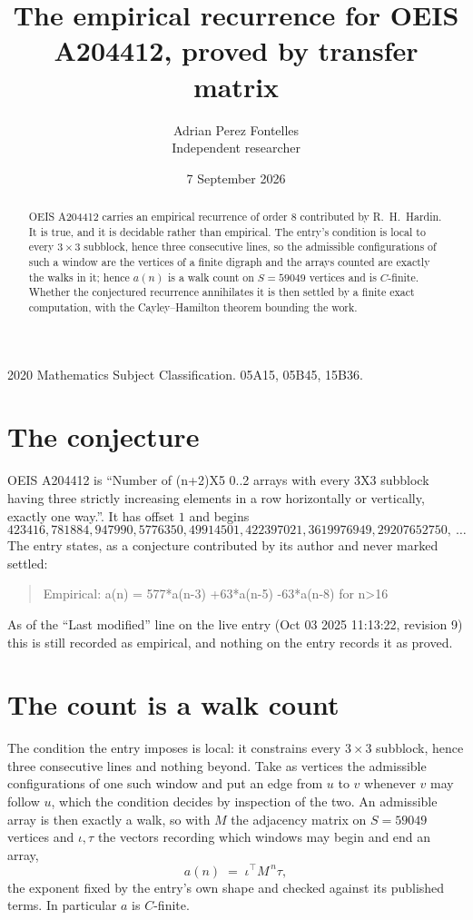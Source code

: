 \documentclass[11pt,a4paper]{article}
\title{The empirical recurrence for OEIS A204412, proved by transfer matrix}
\author{Adrian Perez Fontelles\\ \small Independent researcher}
\date{7 September 2026}
\theoremstyle{plain}
\theoremstyle{definition}
\begin{document}
\maketitle

\begin{abstract}
OEIS A204412 carries an empirical recurrence of order $8$ contributed by R.~H.~Hardin. It is
true, and it is decidable rather than empirical. The entry's condition is local to every $3\times3$ subblock, hence three consecutive lines, so
the admissible configurations of such a window are the vertices of a finite digraph and the
arrays counted are exactly the walks in it; hence $a(n)$ is a walk count on $S=59049$ vertices
and is $C$-finite. Whether the conjectured recurrence annihilates it is then settled by a
finite exact computation, with the Cayley--Hamilton theorem bounding the work.
\end{abstract}

\noindent\small 2020 Mathematics Subject Classification. 05A15, 05B45, 15B36.\normalsize

\section{The conjecture}

OEIS A204412 is ``Number of (n+2)X5 0..2 arrays with every 3X3 subblock having three strictly increasing elements in a row horizontally or vertically, exactly one way.''. It has offset $1$ and begins
\[
423416, 781884, 947990, 5776350, 49914501, 422397021, 3619976949, 29207652750,\ \dots
\]
The entry states, as a conjecture contributed by its author and never marked settled:
\begin{quote}
Empirical: a(n) = 577*a(n-3) +63*a(n-5) -63*a(n-8) for n>16
\end{quote}
As of the ``Last modified'' line on the live entry (Oct 03 2025 11:13:22, revision 9) this is still
recorded as empirical, and nothing on the entry records it as proved.

\section{The count is a walk count}

The condition the entry imposes is local: it constrains every $3\times3$ subblock, hence three consecutive lines and nothing beyond. Take as
vertices the admissible configurations of one such window and put an edge from $u$ to $v$
whenever $v$ may follow $u$, which the condition decides by inspection of the two. An
admissible array is then exactly a walk, so with $M$ the adjacency matrix on $S=59049$ vertices
and $\iota,\tau$ the vectors recording which windows may begin and end an array,
\[
a(n)\;=\;\iota^{\!\top}M^{\,n}\tau ,
\]
the exponent fixed by the entry's own shape and checked against its published terms. In
particular $a$ is $C$-finite.
\end{document}
